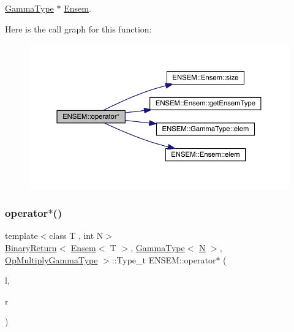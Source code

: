 \mbox{\hyperlink{classENSEM_1_1GammaType}{Gamma\+Type}} $\ast$ \mbox{\hyperlink{classENSEM_1_1Ensem}{Ensem}}. 

Here is the call graph for this function\+:\nopagebreak
\begin{figure}[H]
\begin{center}
\leavevmode
\includegraphics[width=350pt]{d1/d9e/group__eensem_ga399b896691f2d528edcade561c6e571d_cgraph}
\end{center}
\end{figure}
\mbox{\label{group__eensem_ga5a4ddba3b396c11e474246b57940a2cc}} 
\subsubsection{\texorpdfstring{operator$\ast$()}{operator*()}\hspace{0.1cm}{\footnotesize\ttfamily [7/11]}}
{\footnotesize\ttfamily template$<$class T , int N$>$ \\
\mbox{\hyperlink{structENSEM_1_1BinaryReturn}{Binary\+Return}}$<$ \mbox{\hyperlink{classENSEM_1_1Ensem}{Ensem}}$<$ T $>$, \mbox{\hyperlink{classENSEM_1_1GammaType}{Gamma\+Type}}$<$ \mbox{\hyperlink{adat__devel_2lib_2hadron_2operator__name__util_8cc_a7722c8ecbb62d99aee7ce68b1752f337}{N}} $>$, \mbox{\hyperlink{structENSEM_1_1OpMultiplyGammaType}{Op\+Multiply\+Gamma\+Type}} $>$\+::Type\+\_\+t E\+N\+S\+E\+M\+::operator$\ast$ (\begin{DoxyParamCaption}\item[{const \mbox{\hyperlink{classENSEM_1_1Ensem}{Ensem}}$<$ T $>$ \&}]{l,  }\item[{const \mbox{\hyperlink{classENSEM_1_1GammaType}{Gamma\+Type}}$<$ \mbox{\hyperlink{adat__devel_2lib_2hadron_2operator__name__util_8cc_a7722c8ecbb62d99aee7ce68b1752f337}{N}} $>$ \&}]{r }\end{DoxyParamCaption})\hspace{0.3cm}{\ttfamily [inline]}}



